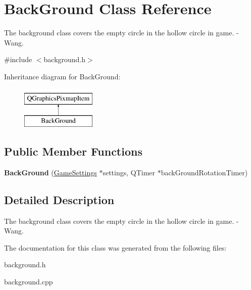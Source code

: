 \hypertarget{class_back_ground}{}\section{Back\+Ground Class Reference}
\label{class_back_ground}


The background class covers the empty circle in the hollow circle in game. -\/ Wang.  




{\ttfamily \#include $<$background.\+h$>$}

Inheritance diagram for Back\+Ground\+:\begin{figure}[H]
\begin{center}
\leavevmode
\includegraphics[height=2.000000cm]{class_back_ground}
\end{center}
\end{figure}
\subsection*{Public Member Functions}
\begin{DoxyCompactItemize}
\item 
{\bfseries Back\+Ground} (\hyperlink{class_game_settings}{Game\+Settings} $\ast$settings, Q\+Timer $\ast$back\+Ground\+Rotation\+Timer)\hypertarget{class_back_ground_a30f171b979fa95cff7e4beea65da174e}{}\label{class_back_ground_a30f171b979fa95cff7e4beea65da174e}

\end{DoxyCompactItemize}


\subsection{Detailed Description}
The background class covers the empty circle in the hollow circle in game. -\/ Wang. 

The documentation for this class was generated from the following files\+:\begin{DoxyCompactItemize}
\item 
background.\+h\item 
background.\+cpp\end{DoxyCompactItemize}
